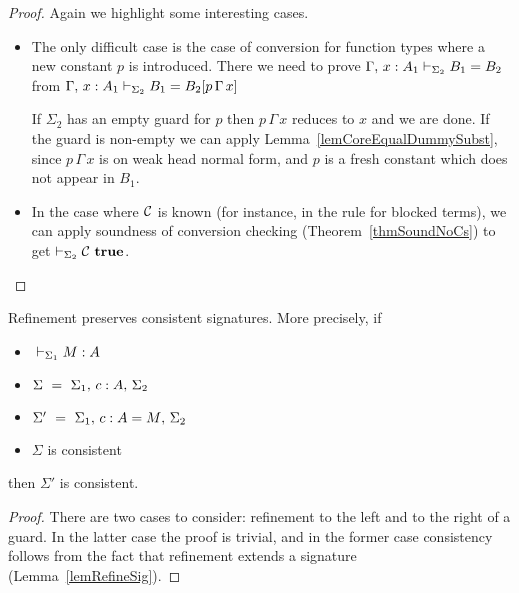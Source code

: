 \if {}
\begin{proof}
    Again we highlight some interesting cases.
    \begin{itemize}
	\item 
	
	The only difficult case is the case of conversion for function types
	where a new constant $p$ is introduced. There we need to prove
	$\EqualTypeCS {\Sigma_2} {\Ext \Gamma x : A_1} {B_1} {B_2}$ from
	$\EqualTypeCS {\Sigma_2} {\Ext \Gamma x : A_1} {B_1} {\SubstD {B_2} {p
	\, \Gamma \, x}}$

	If $\Sigma_2$ has an empty guard for $p$ then $p \, \Gamma \, x$
	reduces to $x$ and we are done. If the guard is non-empty we can apply
	Lemma~\ref{lemCoreEqualDummySubst}, since $p \, \Gamma \, x$ is on weak
	head normal form, and $p$ is a fresh constant which does not appear in
	$B_1$.

	\item In the case where $\Cs$ is known (for instance, in the rule for
	blocked terms), we can apply soundness of conversion checking
	(Theorem~\ref{thmSoundNoCs}) to get $\TrueConstr {\Sigma_2} \Cs$.

    \end{itemize}
\end{proof}
\fi

\begin{lemma} \label{lemRefineConsistent}
    Refinement preserves consistent signatures.
\if {}
    More precisely, if
    \begin{itemize}
	\item $\HasTypeCS {\Sigma_1} {} M A$
	\item $\Sigma ~ = ~ \Ext {\Sigma_1} \Ext {\MetaDecl c A} \Sigma_2$
	\item $\Sigma' ~ = ~ \Ext {\Sigma_1} \Ext {\IMetaDecl c A M} \Sigma_2$
	\item $\Sigma$ is consistent
    \end{itemize}
    then $\Sigma'$ is consistent.
\fi
\end{lemma}

\if {}
\begin{proof}
    There are two cases to consider: refinement to the left and to the right of
    a guard. In the latter case the proof is trivial, and in the former case
    consistency follows from the fact that refinement extends a signature
    (Lemma~\ref{lemRefineSig}).
\end{proof}
\fi

